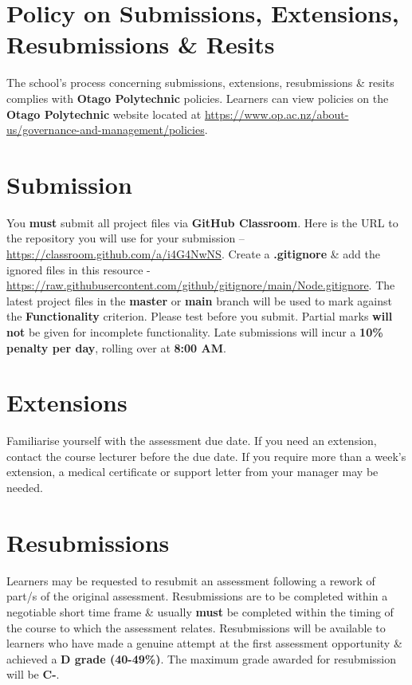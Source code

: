 \documentclass{article}
\begin{document}
\section*{Policy on Submissions, Extensions, Resubmissions \& Resits}
The school's process concerning submissions, extensions, resubmissions \& resits complies with \textbf{Otago Polytechnic} policies. Learners can view policies on the \textbf{Otago Polytechnic} website located at \href{https://www.op.ac.nz/about-us/governance-and-management/policies}{https://www.op.ac.nz/about-us/governance-and-management/policies}.

\section*{Submission}
You \textbf{must} submit all project files via \textbf{GitHub Classroom}. Here is the URL to the repository you will use for your submission – \href{https://classroom.github.com/a/i4G4NwNS}{https://classroom.github.com/a/i4G4NwNS}.  Create a \textbf{.gitignore} \& add the ignored files in this resource - \href{https://raw.githubusercontent.com/github/gitignore/main/Node.gitignore}{https://raw.githubusercontent.com/github/gitignore/main/Node.gitignore}. The latest project files in the \textbf{master} or \textbf{main} branch will be used to mark against the \textbf{Functionality} criterion. Please test before you submit. Partial marks \textbf{will not} be given for incomplete functionality. Late submissions will incur a \textbf{10\% penalty per day}, rolling over at \textbf{8:00 AM}.

\section*{Extensions}
Familiarise yourself with the assessment due date. If you need an extension, contact the course lecturer before the due date. If you require more than a week's extension, a medical certificate or support letter from your manager may be needed.

\section*{Resubmissions}
Learners may be requested to resubmit an assessment following a rework of part/s of the original assessment. Resubmissions are to be completed within a negotiable short time frame \& usually \textbf{must} be completed within the timing of the course to which the assessment relates. Resubmissions will be available to learners who have made a genuine attempt at the first assessment opportunity \& achieved a \textbf{D grade (40-49\%)}. The maximum grade awarded for resubmission will be \textbf{C-}.
\end{document}
